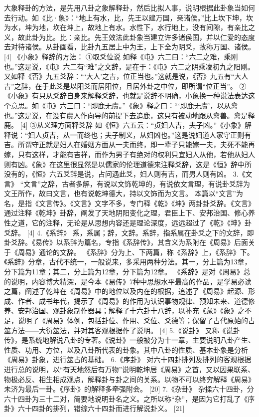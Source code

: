 \documentclass[12pt,UTF8]{ctexbook}
\begin{document}
大象释卦的方法，是先用八卦之象解释卦，然后比拟人事，说明根据此卦象当如何去行动。如《比·象》：“地上有水，比，先王以建万国，亲诸侯。”比上坎下坤，坎为水，坤为地，坎在坤上，故地上有水。水性下，水行地上，没有间隙，有亲比之义，故此卦为比。比：亲比。先王效法此卦象当建立许多诸侯国，并以仁爱的态度去对待诸侯。从卦画看，比卦九五居上中为王，上下全为阴爻，故称万国、诸侯。 [4]
《小象》释辞的方法：
①取爻位说
如释《屯》六二曰：“六二之难，乘刚也。”这是说，《屯》六二有“难”之文辞，是在于：《屯》六二之阴乘凌初九之阳刚。
又如释《否》九五爻辞：“‘大人’之吉，位正当也。”这就是说，《否》九五有“大人吉”之辞，在于此爻是以阳爻而居阳位，且居外卦之中位，即所谓“位正当”。
②《小象》有只从爻辞自身来解释爻辞，也就是说辞不明确，小象换一种说法表达这个意思。如《屯》六三曰：“即鹿无虞。”《象》释之曰：“‘即鹿无虞’，以从禽也。”这是说，在没有虞人作向导的前提下去追鹿，这只有被动地跟从禽兽。禽是释鹿。 [4]
③从义理方面释爻辞
如《恒》六五云：“贞妇人吉，夫子凶。”《小象》解释说：“妇人贞吉，从一而终也；夫子制义，从妇凶也。”这是说妇道人家守正则有吉。所谓守正就是妇人在婚姻方面从一夫而终，即一辈子只能嫁一夫，夫死不能再嫁，只有这样，才能有吉祥，而作为男子有绝对的权利只宜妇人从他，若他从妇人则有凶。《象》在这里很显然是以儒家的伦理道德来注释爻辞，这是《恒》辞中所没有的，《恒》六五爻辞是说，占问遇此爻，妇人则有吉，而男人则有凶。
3.《文言》
“文言”之辞，古者多解，有说以文饰乾坤的，有说依文言理，有说卦爻辞为文王所作，故曰文言，也有说乾坤德大，持以文饰而为文言。
本篇以“文言”为名，是指《文言传》。《文言》文字不多，专门释《乾》《坤》两卦卦爻辞。《文言》通过注释《乾坤》卦辞，阐发了天地阴阳变化之理，君臣上下、安邦治国、修心养性之道，它的注释，无论是从思想内容还是理论深度，远远超过了《乾》《坤》卦爻辞。 [4]
4.《系辞》
系，系属；辞，文辞。系辞，指系属在卦爻之下的文辞，即卦爻辞。《易传》以系辞为篇名，专指《系辞传》，其含义为系附在《周易》后面关于《周易》通论的文辞。
《系辞》分为上、下两篇，称《系辞》上，《系辞》下。《系辞》分章，古代不统一，一般说来，多采用两种分法。其一，分上篇为13章，分下篇为11章；其二，分上篇为12章，分下篇为12章。
《系辞》是对《周易》总的说明，内容博大精深，是今本《易传》7种中思想水平最高的作品，是学易必读之篇，阐述了乾坤在《周易》中的地位以及内在的根据，追述了《周易》起源、形成、作者、成书年代，揭示了《周易》的作用为认识事物规律、预知未来、道德修养、安邦治国、观卦象制作器具；解释了十六卦十八辞，以补充《彖》《象》之不足，说明了《周易》体例，包括卦位、作用、爻位、爻德等；保留了古代原始的占筮方法——大衍筮法，并对其客观根据作了说明。 [4]
5.《说卦》
又称《说卦传》，是系统地解说八卦的专著。《说卦》一般被分为十一章，主要说明八卦产生、性质、功用、方位，以及八卦所代表的卦象。其中八卦的性质、基本卦象是分析《周易》卦象，进行筮占的基础。
6.《序卦》
对六十四卦排列及排列的客观根据进行总的说明，以“有天地然后有万物”说明乾坤居《周易》之首，又以因果联系、物极必反、相生相成观点，解释卦与卦之间的关系。以物不可以终穷解释《周易》未济为最后一卦。《序卦》的解释多牵强附会。 [20]
7.《杂卦》
杂揉六十四卦，分六十四卦为三十二对，简要地说明卦名之义。之所以称“杂”，是因为它打乱了《序卦》六十四卦的排列，错综六十四卦而进行解说卦义。 [21]
\end{document}

